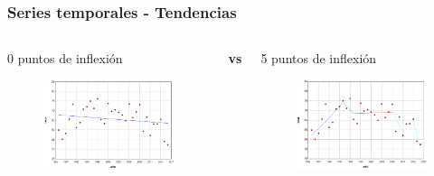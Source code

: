 \documentclass{beamer}
\begin{document}
\begin{frame}\frametitle{Series temporales - Tendencias}
	\vspace{0pt}
	\begin{columns}
		\begin{column}{0.5\textwidth}
			\centering \normalsize 0 puntos de inflexión
			\begin{figure}
				\includegraphics[width=\textwidth]{images/jpo0.png}
			\end{figure}

		\end{column}
		\large{\textbf{vs}}
		\begin{column}{0.5\textwidth}
			\centering \normalsize 5 puntos de inflexión
			\begin{figure}
				\centering
				\includegraphics[width=\textwidth]{images/jpo5.png}
			\end{figure}
		\end{column}
	\end{columns}


\end{frame}
\end{document}
